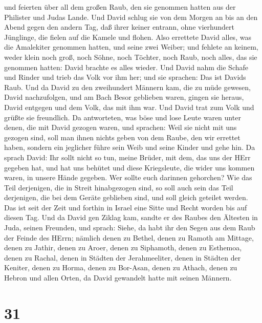 und feierten über all dem großen Raub, den sie genommen hatten aus der
Philister und Judas Lande.  Und David schlug sie von dem
Morgen an bis an den Abend gegen den andern Tag, daß ihrer keiner
entrann, ohne vierhundert Jünglinge, die fielen auf die Kamele und
flohen.  Also errettete David alles, was die Amalekiter
genommen hatten, und seine zwei Weiber;  und fehlete an
keinem, weder klein noch groß, noch Söhne, noch Töchter, noch Raub, noch
alles, das sie genommen hatten: David brachte es alles wieder.
 Und David nahm die Schafe und Rinder und trieb das Volk
vor ihm her; und sie sprachen: Das ist Davids Raub.  Und da
David zu den zweihundert Männern kam, die zu müde gewesen, David
nachzufolgen, und am Bach Besor geblieben waren, gingen sie heraus,
David entgegen und dem Volk, das mit ihm war. Und David trat zum Volk
und grüßte sie freundlich.  Da antworteten, was böse und
lose Leute waren unter denen, die mit David gezogen waren, und sprachen:
Weil sie nicht mit uns gezogen sind, soll man ihnen nichts geben von dem
Raube, den wir errettet haben, sondern ein jeglicher führe sein Weib und
seine Kinder und gehe hin.  Da sprach David: Ihr sollt
nicht so tun, meine Brüder, mit dem, das uns der HErr gegeben hat, und
hat uns behütet und diese Kriegsleute, die wider uns kommen waren, in
unsere Hände gegeben.  Wer sollte euch darinnen gehorchen?
Wie das Teil derjenigen, die in Streit hinabgezogen sind, so soll auch
sein das Teil derjenigen, die bei dem Geräte geblieben sind, und soll
gleich geteilet werden.  Das ist seit der Zeit und forthin
in Israel eine Sitte und Recht worden bis auf diesen Tag. 
Und da David gen Ziklag kam, sandte er des Raubes den Ältesten in Juda,
seinen Freunden, und sprach: Siehe, da habt ihr den Segen aus dem Raub
der Feinde des HErrn;  nämlich denen zu Bethel, denen zu
Ramoth am Mittage, denen zu Jathir,  denen zu Aroer, denen
zu Siphamoth, denen zu Esthemoa,  denen zu Rachal, denen in
Städten der Jerahmeeliter, denen in Städten der Keniter, 
denen zu Horma, denen zu Bor-Asan, denen zu Athach,  denen
zu Hebron und allen Orten, da David gewandelt hatte mit seinen Männern.

\hypertarget{section-30}{%
\section{31}\label{section-30}}

